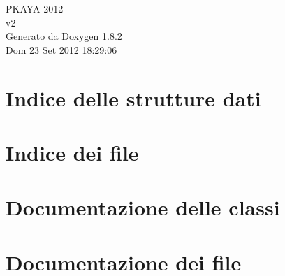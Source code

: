 \documentclass{book}
\begin{document}
\hypersetup{pageanchor=false,citecolor=blue}
\begin{titlepage}
\vspace*{7cm}
\begin{center}
{\Large P\-K\-A\-Y\-A-\/2012 \\[1ex]\large v2 }\\
\vspace*{1cm}
{\large Generato da Doxygen 1.8.2}\\
\vspace*{0.5cm}
{\small Dom 23 Set 2012 18:29:06}\\
\end{center}
\end{titlepage}
\clearemptydoublepage
{}
\tableofcontents
\clearemptydoublepage
{}
\hypersetup{pageanchor=true,citecolor=blue}
\chapter{Indice delle strutture dati}

\chapter{Indice dei file}

\chapter{Documentazione delle classi}













\chapter{Documentazione dei file}


































\printindex
\end{document}
